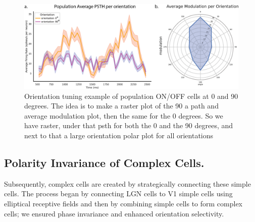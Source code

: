 \documentclass[12pt]{article}
\begin{document}
\begin{figure}[H]
    \centering
    \includegraphics[width=1.0 \textwidth]{figures/figure_simple_orientation_tuning.png}
    \caption{Orientation tuning example of population ON/OFF cells at 0 and 90 degrees. The idea is to make a raster plot of the 90 a path and average modulation plot, then the same for the 0 degrees. So we have raster, under that psth  for both the 0 and the 90 degrees, and next to that a large orientation polar plot for all orientations}
    \label{fig:simple cell orientation tuning}
\end{figure}

\subsection{Polarity Invariance of Complex Cells.}
Subsequently, complex cells are created by strategically connecting these simple cells. The process began by connecting LGN cells to V1 simple cells using elliptical receptive fields and then by combining simple cells to form complex cells; we ensured phase invariance and enhanced orientation selectivity.

\end{document}
